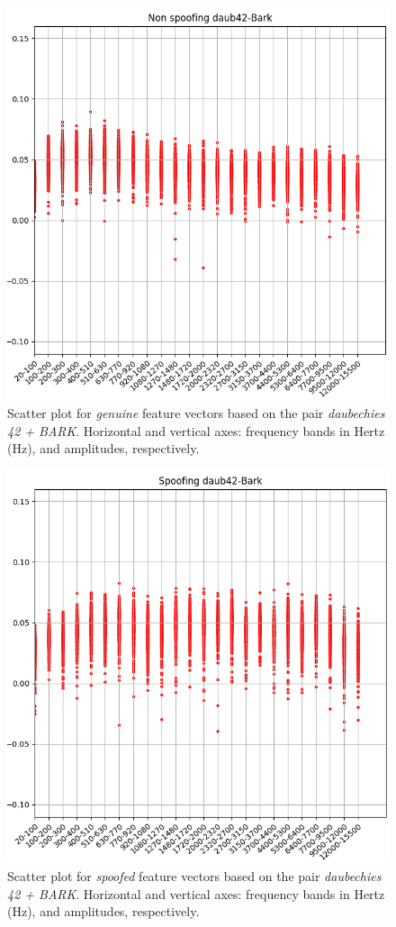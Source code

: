 		\begin{figure}[H]
			\centering
			\includegraphics[scale=.53]{images/results/barkVersusMel/liveDaub42Bark}
			\caption{Scatter plot for \textit{genuine} feature vectors based on the pair \textit{daubechies 42 + BARK}. Horizontal and vertical axes: frequency bands in Hertz (Hz), and amplitudes, respectively.}
			\label{fig:livedaub42bark}
		\end{figure}
		\begin{figure}[H]
			\centering
			\includegraphics[scale=.53]{images/results/barkVersusMel/spoofingDaub42Bark}
			\caption{Scatter plot for \textit{spoofed} feature vectors based on the pair \textit{daubechies 42 + BARK}. Horizontal and vertical axes: frequency bands in Hertz (Hz), and amplitudes, respectively.}
			\label{fig:spoofingdaub42bark}
		\end{figure}
